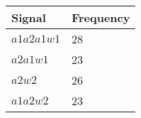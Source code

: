 \begin{center}
	\begin{tabular}{ || m{3cm}| m{3cm} || } 
	\hline
	Signal & Frequency\\ 
	\hline \hline
		$a1a2a1w1$ & \num{28} \\
		$a2a1w1$ & \num{23} \\
		$a2w2$ & \num{26} \\
		$a1a2w2$ & \num{23} \\
	\hline
	\end{tabular}
\end{center}

